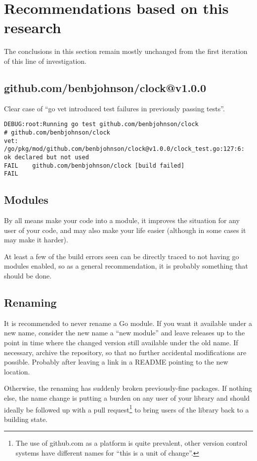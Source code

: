 \documentclass[a4paper]{paper}
\begin{document}
\section{Recommendations based on this research}

The conclusions in this section remain mostly unchanged from the first
iteration of this line of investigation.

\subsection{github.com/benbjohnson/clock@v1.0.0}

Clear case of ``go vet introduced test failures in previously passing tests''.

\begin{verbatim}
DEBUG:root:Running go test github.com/benbjohnson/clock
# github.com/benbjohnson/clock
vet: /go/pkg/mod/github.com/benbjohnson/clock@v1.0.0/clock_test.go:127:6: ok declared but not used
FAIL	github.com/benbjohnson/clock [build failed]
FAIL
\end{verbatim}

\subsection{Modules}

By all means make your code into a module, it improves the situation
for any user of your code, and may also make your life easier
(although in some cases it may make it harder).

At least a few of the build errors seen can be directly traced to not
having go modules enabled, so as a general recommendation, it is
probably something that should be done.

\subsection{Renaming}
It is recommended to never rename a Go module. If you want it available
under a new name, consider the new name a ``new module'' and leave
releases up to the point in time where the changed version still
available under the old name. If necessary, archive the repository, so
that no further accidental modifications are possible. Probably after
leaving a link in a README pointing to the new location.

Otherwise, the renaming has suddenly broken previously-fine
packages. If nothing else, the name change is putting a burden on any
user of your library and should ideally be followed up with a pull
request\footnote{The use of github.com as a platform is quite
  prevalent, other version control systems have different names for
  ``this is a unit of change''.} to bring users of the library back to
a building state.
\end{document}
